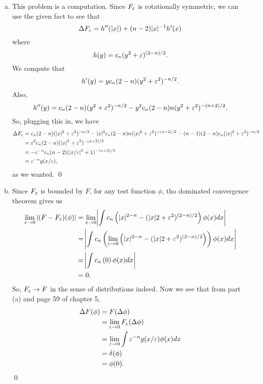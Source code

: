 \documentclass{article}
\begin{document}
\begin{enumerate}[(a)]
    \item This problem is a computation. Since $F_\varepsilon$ is rotationally symmetric, we can use the given fact to see that 
    \[\Delta F_\varepsilon = h''(|x|) + (n-2)|x|{^{-1}} h'(x)\]
    where 
    \[h(y) = c_n(y^2+\varepsilon)^{(2-n)/2}.\]
    We compute that 
    \[h'(y) = yc_n(2-n)(y^2+\varepsilon^2)^{-n/2}.\]
    Also, 
    \[h''(y) = c_n(2-n)(y^2+\varepsilon^2)^{-n/2} - y^2c_n(2-n)n(y^2+\varepsilon^2)^{-(n+2)/2}.\]
    So, plugging this in, we have 
    \begin{align*}
        \Delta F_\varepsilon &= c_n (2-n)(|x|^2+\varepsilon^2)^{-n/2}- |x|^2c_n(2-n)n(|x|^2+\varepsilon^2)^{-(n-2)/2} - (n-1)(2-n)c_n(|x|^2 + \varepsilon^2)^{-n/2}\\
        &=\varepsilon^2 c_n(2-n)(|x|^2 + \varepsilon^2)^{-(n+2)/2}\\
        &=-\varepsilon^{-n} c_n(n-2)(|x/\varepsilon|^2 + 1)^{-(n+2)/2}\\
        &= \varepsilon^{-n}g(x/\varepsilon),
    \end{align*}
    as we wanted. \qed
    \item Since $F_\varepsilon$ is bounded by $F$, for any test function $\phi$, tho dominated convergence theorem gives us
    \begin{align*}
       \lim_{\eps \to 0} |(F-F_\eps)(\phi)| &= \lim_{\eps \to 0} \abs{\int c_n\del{|x|^{2-n} - (|x|2 + \eps^2)^{(2-n)/2} }\phi(x) dx} \\
       &=  \abs{\int c_n\del{ \lim_{\eps \to 0}\del{|x|^{2-n} - (|x|2 + \eps^2)^{(2-n)/2} }}\phi(x) dx}\\
       &=  \abs{\int c_n\del{0}\phi(x) dx}\\
       &= 0.
    \end{align*}
    So, $F_\varepsilon \to F$ in the sense of distributions indeed. 
    \hop 
    Now we see that from part (a) and page 59 of chapter 5,
    \begin{align*}
        \Delta F(\phi) &= F(\Delta \phi) \\
        &= \lim_{\varepsilon \to 0} F_\varepsilon (\Delta \phi) \\
        &= \lim_{\varepsilon \to 0} \int \varepsilon^{-n}g(x/\varepsilon) \phi(x) dx\\
        &= \delta(\phi) \\
        &= \phi(0).
    \end{align*}
    \qed
\end{enumerate}
\end{document}
